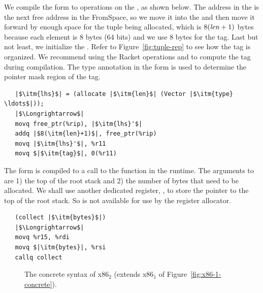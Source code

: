 \documentclass[11pt]{book}
\newcommand{\gray}[1]{{\color{gray} #1}}
\begin{document}
We compile the  form to operations on the
, as shown below. The address in the 
is the next free address in the FromSpace, so we move it into the
 and then move it forward by enough space for the tuple being
allocated, which is $8(\mathit{len}+1)$ bytes because each element is 8
bytes (64 bits) and we use 8 bytes for the tag. Last but not least, we
initialize the . Refer to Figure~\ref{fig:tuple-rep} to see
how the tag is organized. We recommend using the Racket operations
 and  to compute the tag
during compilation.  The type annotation in the  form is
used to determine the pointer mask region of the tag.
\begin{lstlisting}
   |$\itm{lhs}$| = (allocate |$\itm{len}$| (Vector |$\itm{type} \ldots$|));
   |$\Longrightarrow$|
   movq free_ptr(%rip), |$\itm{lhs}'$|
   addq |$8(\itm{len}+1)$|, free_ptr(%rip)
   movq |$\itm{lhs}'$|, %r11
   movq $|$\itm{tag}$|, 0(%r11)
\end{lstlisting}

The  form is compiled to a call to the 
function in the runtime. The arguments to  are 1) the
top of the root stack and 2) the number of bytes that need to be
allocated.  We shall use another dedicated register, , to
store the pointer to the top of the root stack. So  is not
available for use by the register allocator.
\begin{lstlisting}
   (collect |$\itm{bytes}$|)
   |$\Longrightarrow$|
   movq %r15, %rdi
   movq $|\itm{bytes}|, %rsi
   callq collect
\end{lstlisting}



\begin{figure}[tp]
\fbox{
\begin{minipage}{0.96\textwidth}
\[
\begin{array}{lcl}
  \Arg &::=& \gray{ \key{\$}\Int \mid \key{\%}\Reg \mid \Int\key{(}\key{\%}\Reg\key{)} \mid \key{\%}\itm{bytereg} } \mid \Var \key{(\%rip)} \\
x86_1 &::= & \gray{ \key{.globl main} }\\
      &    & \gray{ \key{main:} \; \Instr\ldots }
\end{array}
\]
\end{minipage}
}
\caption{The concrete syntax of x86$_2$  (extends x86$_1$ of Figure~\ref{fig:x86-1-concrete}).}
\label{fig:x86-2-concrete}
\end{figure}
\end{document}
